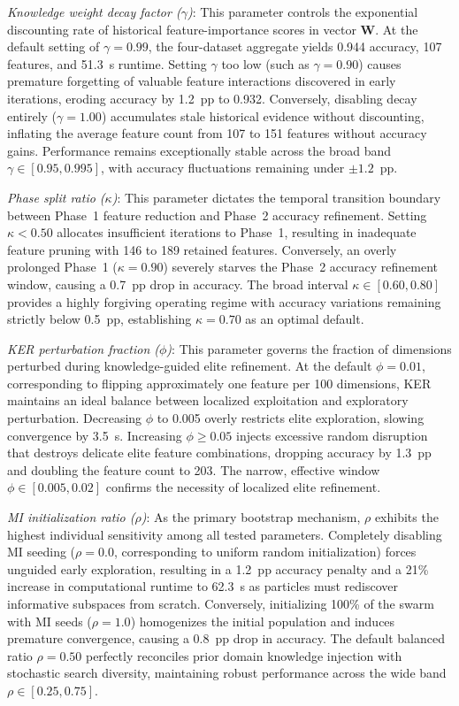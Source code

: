 \textit{Knowledge weight decay factor ($\gamma$)}: This parameter controls the exponential discounting rate of historical feature-importance scores in vector $\mathbf{W}$. At the default setting of $\gamma=0.99$, the four-dataset aggregate yields 0.944 accuracy, 107 features, and 51.3~s runtime. Setting $\gamma$ too low (such as $\gamma=0.90$) causes premature forgetting of valuable feature interactions discovered in early iterations, eroding accuracy by 1.2~pp to 0.932. Conversely, disabling decay entirely ($\gamma = 1.00$) accumulates stale historical evidence without discounting, inflating the average feature count from 107 to 151 features without accuracy gains. Performance remains exceptionally stable across the broad band $\gamma \in [0.95, 0.995]$, with accuracy fluctuations remaining under $\pm 1.2$~pp.

\textit{Phase split ratio ($\kappa$)}: This parameter dictates the temporal transition boundary between Phase~1 feature reduction and Phase~2 accuracy refinement. Setting $\kappa < 0.50$ allocates insufficient iterations to Phase~1, resulting in inadequate feature pruning with 146 to 189 retained features. Conversely, an overly prolonged Phase~1 ($\kappa = 0.90$) severely starves the Phase~2 accuracy refinement window, causing a 0.7~pp drop in accuracy. The broad interval $\kappa \in [0.60, 0.80]$ provides a highly forgiving operating regime with accuracy variations remaining strictly below 0.5~pp, establishing $\kappa=0.70$ as an optimal default.

\textit{KER perturbation fraction ($\phi$)}: This parameter governs the fraction of dimensions perturbed during knowledge-guided elite refinement. At the default $\phi = 0.01$, corresponding to flipping approximately one feature per 100 dimensions, KER maintains an ideal balance between localized exploitation and exploratory perturbation. Decreasing $\phi$ to 0.005 overly restricts elite exploration, slowing convergence by 3.5~s. Increasing $\phi \ge 0.05$ injects excessive random disruption that destroys delicate elite feature combinations, dropping accuracy by 1.3~pp and doubling the feature count to 203. The narrow, effective window $\phi \in [0.005, 0.02]$ confirms the necessity of localized elite refinement.

\textit{MI initialization ratio ($\rho$)}: As the primary bootstrap mechanism, $\rho$ exhibits the highest individual sensitivity among all tested parameters. Completely disabling MI seeding ($\rho = 0.0$, corresponding to uniform random initialization) forces unguided early exploration, resulting in a 1.2~pp accuracy penalty and a 21\% increase in computational runtime to 62.3~s as particles must rediscover informative subspaces from scratch. Conversely, initializing 100\% of the swarm with MI seeds ($\rho = 1.0$) homogenizes the initial population and induces premature convergence, causing a 0.8~pp drop in accuracy. The default balanced ratio $\rho = 0.50$ perfectly reconciles prior domain knowledge injection with stochastic search diversity, maintaining robust performance across the wide band $\rho \in [0.25, 0.75]$.


